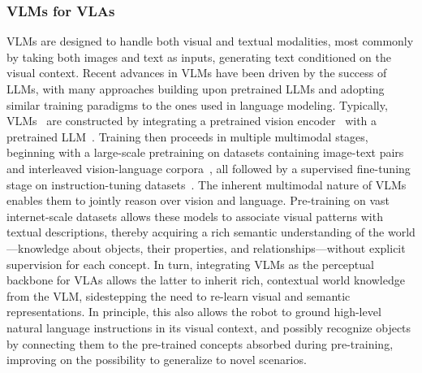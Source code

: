 \subsubsection{VLMs for VLAs}
VLMs are designed to handle both visual and textual modalities, most commonly by taking both images and text as inputs, generating text conditioned on the visual context.
Recent advances in VLMs have been driven by the success of LLMs, with many approaches building upon pretrained LLMs and adopting similar training paradigms to the ones used in language modeling.
Typically, VLMs~\citep{alayracFlamingoVisualLanguage2022,laurenconWhatMattersWhen2024,linVILAPretrainingVisual2024} are constructed by integrating a pretrained vision encoder~\citep{radfordLearningTransferableVisual2021,zhaiSigmoidLossLanguage2023,finiMultimodalAutoregressivePretraining2024} with a pretrained LLM~\citep{grattafioriLlama3Herd2024,jiangMistral7B2023}.
Training then proceeds in multiple multimodal stages, beginning with a large-scale pretraining on datasets containing image-text pairs~\citep{LAION-COCO,kakaobrain2022coyo700m} and interleaved vision-language corpora~\citep{OBELICS,MMC4}, all followed by a supervised fine-tuning stage on instruction-tuning datasets~\citep{LLaVA-1.5,tong2024cambrian,laurenconWhatMattersWhen2024}.
The inherent multimodal nature of VLMs enables them to jointly reason over vision and language. 
Pre-training on vast internet-scale datasets allows these models to associate visual patterns with textual descriptions, thereby acquiring a rich semantic understanding of the world---knowledge about objects, their properties, and relationships---without explicit supervision for each concept. 
In turn, integrating VLMs as the perceptual backbone for VLAs allows the latter to inherit rich, contextual world knowledge from the VLM, sidestepping the need to re-learn visual and semantic representations.
In principle, this also allows the robot to ground high-level natural language instructions in its visual context, and possibly recognize objects by connecting them to the pre-trained concepts absorbed during pre-training, improving on the possibility to generalize to novel scenarios.

